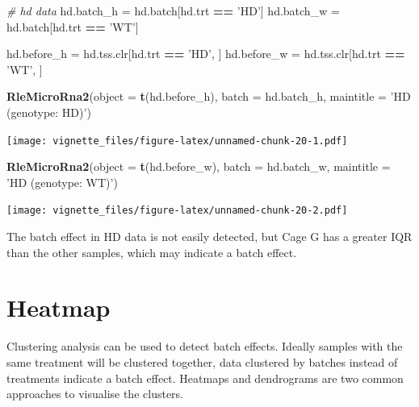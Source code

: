 \documentclass[]{book}
\newenvironment{Shaded}{\begin{snugshade}}{\end{snugshade}}
\newcommand{\KeywordTok}[1]{\textcolor[rgb]{0.13,0.29,0.53}{\textbf{#1}}}
\newcommand{\DataTypeTok}[1]{\textcolor[rgb]{0.13,0.29,0.53}{#1}}
\newcommand{\StringTok}[1]{\textcolor[rgb]{0.31,0.60,0.02}{#1}}
\newcommand{\CommentTok}[1]{\textcolor[rgb]{0.56,0.35,0.01}{\textit{#1}}}
\newcommand{\OperatorTok}[1]{\textcolor[rgb]{0.81,0.36,0.00}{\textbf{#1}}}
\newcommand{\NormalTok}[1]{#1}
\begin{document}
\begin{Shaded}
\begin{Highlighting}[]
\CommentTok{# hd data}
\NormalTok{hd.batch_h =}\StringTok{ }\NormalTok{hd.batch[hd.trt }\OperatorTok{==}\StringTok{ 'HD'}\NormalTok{]}
\NormalTok{hd.batch_w =}\StringTok{ }\NormalTok{hd.batch[hd.trt }\OperatorTok{==}\StringTok{ 'WT'}\NormalTok{] }

\NormalTok{hd.before_h =}\StringTok{ }\NormalTok{hd.tss.clr[hd.trt }\OperatorTok{==}\StringTok{ 'HD'}\NormalTok{, ]}
\NormalTok{hd.before_w =}\StringTok{ }\NormalTok{hd.tss.clr[hd.trt }\OperatorTok{==}\StringTok{ 'WT'}\NormalTok{, ]}

\KeywordTok{RleMicroRna2}\NormalTok{(}\DataTypeTok{object =} \KeywordTok{t}\NormalTok{(hd.before_h), }\DataTypeTok{batch =}\NormalTok{ hd.batch_h, }
             \DataTypeTok{maintitle =} \StringTok{'HD (genotype: HD)'}\NormalTok{)}
\end{Highlighting}
\end{Shaded}

\texttt{[image: vignette\_files/figure-latex/unnamed-chunk-20-1.pdf]}

\begin{Shaded}
\begin{Highlighting}[]
\KeywordTok{RleMicroRna2}\NormalTok{(}\DataTypeTok{object =} \KeywordTok{t}\NormalTok{(hd.before_w), }\DataTypeTok{batch =}\NormalTok{ hd.batch_w, }
             \DataTypeTok{maintitle =} \StringTok{'HD (genotype: WT)'}\NormalTok{)}
\end{Highlighting}
\end{Shaded}

\texttt{[image: vignette\_files/figure-latex/unnamed-chunk-20-2.pdf]}

The batch effect in HD data is not easily detected, but Cage G has a
greater IQR than the other samples, which may indicate a batch effect.

\section{Heatmap}\label{heatmap}

Clustering analysis can be used to detect batch effects. Ideally samples
with the same treatment will be clustered together, data clustered by
batches instead of treatments indicate a batch effect. Heatmaps and
dendrograms are two common approaches to visualise the clusters.
\end{document}
